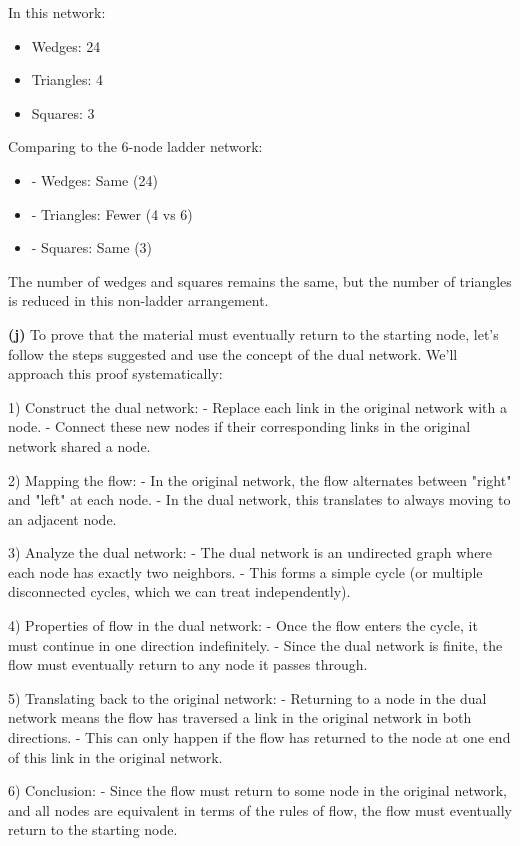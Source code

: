 \documentclass{article}
\begin{document}
In this network:
\begin{itemize}
    \item Wedges: 24
    \item Triangles: 4
    \item Squares: 3
\end{itemize}

Comparing to the 6-node ladder network:
\begin{itemize}
    \item - Wedges: Same (24)
    \item - Triangles: Fewer (4 vs 6)
    \item - Squares: Same (3)
\end{itemize}

The number of wedges and squares remains the same, but the number of triangles is reduced in this non-ladder arrangement.


\textbf{(j)} To prove that the material must eventually return to the starting node, let's follow the steps suggested and use the concept of the dual network. We'll approach this proof systematically:

1) Construct the dual network:
   - Replace each link in the original network with a node.
   - Connect these new nodes if their corresponding links in the original network shared a node.

2) Mapping the flow:
   - In the original network, the flow alternates between "right" and "left" at each node.
   - In the dual network, this translates to always moving to an adjacent node.

3) Analyze the dual network:
   - The dual network is an undirected graph where each node has exactly two neighbors.
   - This forms a simple cycle (or multiple disconnected cycles, which we can treat independently).

4) Properties of flow in the dual network:
   - Once the flow enters the cycle, it must continue in one direction indefinitely.
   - Since the dual network is finite, the flow must eventually return to any node it passes through.

5) Translating back to the original network:
   - Returning to a node in the dual network means the flow has traversed a link in the original network in both directions.
   - This can only happen if the flow has returned to the node at one end of this link in the original network.

6) Conclusion:
   - Since the flow must return to some node in the original network, and all nodes are equivalent in terms of the rules of flow, the flow must eventually return to the starting node.
\end{document}
